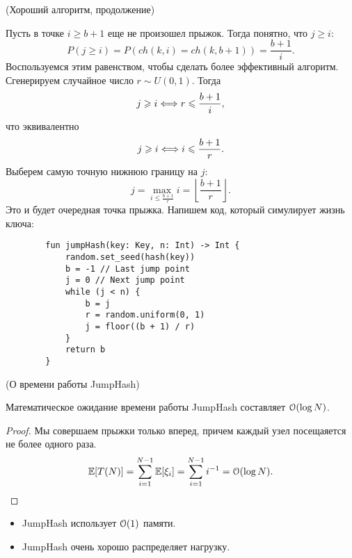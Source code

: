 \begin{algorithm}(Хороший алгоритм, продолжение)

    Пусть в точке $i \geqslant b + 1$ еще не произошел прыжок. Тогда понятно,
    что $j \geqslant i$:
    \[
        P(j \geqslant i) = P(ch(k, i) = ch(k, b + 1)) = \frac{b + 1}{i}
    .\]
    Воспользуемся этим равенством, чтобы сделать более эффективный алгоритм.
    Сгенерируем случайное число $r \sim U(0, 1)$. Тогда
    \[
        j \geqslant i \Longleftrightarrow r \leqslant \frac{b + 1}{i}
    ,\]
    что эквивалентно
    \[
        j \geqslant i \Longleftrightarrow i \leqslant \frac{b + 1}{r}
    .\]
    Выберем самую точную нижнюю границу на $j$:
    \[
        j = \max_{i \leqslant \frac{b + 1}{r}}{i} = \left\lfloor \frac{b + 1}{r}
            \right\rfloor
    .\]
    Это и будет очередная точка прыжка. Напишем код, который симулирует жизнь
    ключа:
    \begin{lstlisting}
        fun jumpHash(key: Key, n: Int) -> Int {
            random.set_seed(hash(key))
            b = -1 // Last jump point
            j = 0 // Next jump point
            while (j < n) {
                b = j
                r = random.uniform(0, 1)
                j = floor((b + 1) / r)
            }
            return b
        }
    \end{lstlisting}
\end{algorithm}

\begin{lemma}(О времени работы JumpHash)

    Математическое ожидание времени работы JumpHash составляет $\mathcal{O}(\log{N})$.
\end{lemma}
\begin{proof}
    Мы совершаем прыжки только вперед, причем каждый узел посещаяется не более
    одного раза.
    \[
        \mathbb{E}[T(N)] = \sum_{i = 1}^{N - 1}{\mathbb{E}[\xi_i]} = \sum_{i = 1}^{N - 1}{i^{-1}}
        = \mathcal{O}(\log{N})
    .\]
\end{proof}

\begin{remark}
    \enewline
    \begin{itemize}
        \item JumpHash использует $\mathcal{O}(1)$ памяти.
        \item JumpHash очень хорошо распределяет нагрузку.
    \end{itemize}
\end{remark}
